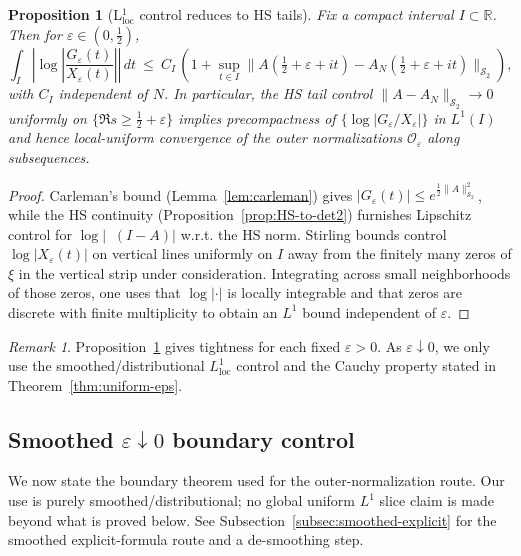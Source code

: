 \documentclass[11pt]{article}
\newtheorem{proposition}[theorem]{Proposition}
\theoremstyle{definition}
\theoremstyle{remark}
\newtheorem{remark}[theorem]{Remark}
\newcommand{\HS}{\mathcal{S}_2}
\DeclareMathOperator{\dettwo}{det_2}
\begin{document}
\begin{proposition}[L$^1_{\mathrm{loc}}$ control reduces to HS tails]\label{prop:L1loc}
Fix a compact interval $I\subset\mathbb R$. Then for \(\varepsilon\in(0,\tfrac12)\),
\[
 \int_{I}\left|\log\left|\frac{G_{\varepsilon}(t)}{X_{\varepsilon}(t)}\right|\right|\,dt\ \le\ C_I\,\left(1+\sup_{t\in I}\|A(\tfrac12+\varepsilon+it)-A_N(\tfrac12+\varepsilon+it)\|_{\HS}\right),
\]
with $C_I$ independent of $N$. In particular, the HS tail control $\|A-A_N\|_{\HS}\to 0$ uniformly on \(\{\Re s\ge \tfrac12+\varepsilon\}\) implies precompactness of \(\{\log|G_{\varepsilon}/X_{\varepsilon}|\}\) in $L^1(I)$ and hence local-uniform convergence of the outer normalizations \(\mathcal O_{\varepsilon}\) along subsequences.
\end{proposition}
\begin{proof}
Carleman's bound (Lemma~\ref{lem:carleman}) gives \(|G_{\varepsilon}(t)|\le e^{\tfrac12\|A\|_{\HS}^2}\), while the HS continuity (Proposition~\ref{prop:HS-to-det2}) furnishes Lipschitz control for \(\log|\dettwo(I-A)|\) w.r.t. the HS norm. Stirling bounds control \(\log|X_{\varepsilon}(t)|\) on vertical lines uniformly on $I$ away from the finitely many zeros of \(\xi\) in the vertical strip under consideration. Integrating across small neighborhoods of those zeros, one uses that \(\log|\cdot|\) is locally integrable and that zeros are discrete with finite multiplicity to obtain an $L^1$ bound independent of \(\varepsilon\).
\end{proof}
\begin{remark}
Proposition~\ref{prop:L1loc} gives tightness for each fixed \(\varepsilon>0\). As \(\varepsilon\downarrow 0\), we only use the smoothed/distributional $L^1_{\mathrm{loc}}$ control and the Cauchy property stated in Theorem~\ref{thm:uniform-eps}.
\end{remark}
\subsection{Smoothed \(\varepsilon\downarrow 0\) boundary control}\label{subsec:uniform-eps}
We now state the boundary theorem used for the outer-normalization route. Our use is purely smoothed/distributional; no global uniform $L^1$ slice claim is made beyond what is proved below. See Subsection~\ref{subsec:smoothed-explicit} for the smoothed explicit-formula route and a de-smoothing step.
\end{document}
